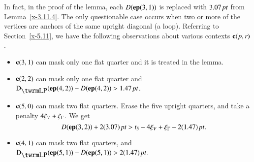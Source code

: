 In fact, in the proof of the lemma, each $D({\operatorname{\bf ep}}{(3,1)})$ is replaced with
$3.07\,\hbox{\it pt}$ from Lemma~\ref{x-3.11.4}.  The only questionable case
occurs when two or more of the vertices are anchors of the same upright
diagonal (a loop). Referring to Section~\ref{x-5.11}, we have the
following observations about various contexts ${\operatorname{\bf c}}{(p,r)}$.

\begin{itemize}
    \item ${\operatorname{\bf c}}{(3,1)}$ can mask only one flat quarter and it is treated in the
lemma.
    \item ${\operatorname{\bf c}}{(2,2)}$ can mask only one flat quarter and
    $\DLP(\y{(4,2)})-D(\y{(4,2)})>1.47\,\pt$.
    \item ${\operatorname{\bf c}}{(5,0)}$ can mask two flat quarters.  Erase the five upright quarters,
        and take a penalty $4\xi_V+\xi_\Gamma$.  We get
    $$D({\operatorname{\bf ep}}{(3,2)})+2(3.07)\,\hbox{\it pt} > t_5+4\xi_V+\xi_\Gamma+2(1.47)\,\hbox{\it pt}.$$
    \item ${\operatorname{\bf c}}{(4,1)}$ can mask two flat quarters, and $\DLP(\y{(5,1)})-D(\y{(5,1)})>2(1.47)\,\pt$.
\end{itemize}




